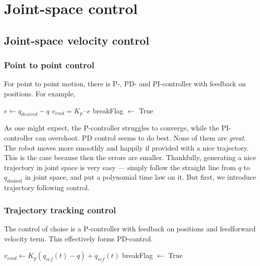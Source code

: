 \section{Joint-space control}
\subsection{Joint-space velocity control}
\subsubsection{Point to point control}
For point to point motion,
there is P-, PD- and PI-controller with feedback on positions.
For example,

\begin{algorithm}[H]
\caption{moveJP}
\begin{algorithmic}[1] %
\State $ e \gets q_{desired} - q$ 
    \State $v_{cmd} = K_p \cdot e$
    \State breakFlag $\gets$ True
    \EndIf
\EndWhile
\EndProcedure
\end{algorithmic}
\label{cart-reference-algorithm}
\end{algorithm}

As one might expect, the P-controller struggles to converge,
while the PI-controller can overshoot.
PD control seems to do best. None of them are \textit{great}.
The robot moves more smoothly and happily if provided
with a nice trajectory. This is the case
because then the errors are smaller. Thankfully,
generating a nice trajectory in joint space is very easy ---
simply follow the straight line from $q$ to $q_\text{desired}$
in joint space, and put a polynomial time law on it.
But first, we introduce trajectory following control.



\subsubsection{Trajectory tracking control}
The control of choise is a P-controller with feedback on positions 
and feedforward velocity term. This effectively forms PD-control.

\begin{algorithm}[H]
\caption{followParametrizedJointTrajectory}
\begin{algorithmic}[1] %
\State $v_{cmd} \gets K_p (q_{ref}(t) - q) + \dot{q}_{ref}(t)$
\State breakFlag $\gets$ True
\EndIf
\EndWhile
\EndProcedure
\end{algorithmic}
\label{algo-joint-traj-tracking}
\end{algorithm}

